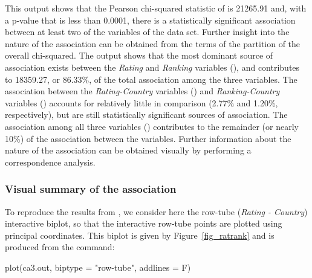 This output shows that the Pearson chi-squared statistic of  is 21265.91 and, with a p-value that is less than 0.0001,  there is a statistically significant association between at least two of the variables of the data set. Further insight into the nature of the association can be obtained from the terms of the partition of the overall chi-squared. The output shows that the most dominant source of association exists between the {\it Rating} and {\it Ranking} variables (), and contributes to 18359.27, or 86.33\%, of the total association among the three variables. The association between the {\it Rating-Country} variables () and {\it Ranking-Country} variables () accounts for relatively little in comparison (2.77\% and 1.20\%, respectively),  but are still statistically significant sources of association. The association among all three variables () contributes to the remainder (or nearly 10\%) of the association between the variables. Further information about the nature of the association can be obtained visually by performing a correspondence analysis. 

\subsubsection{Visual summary of the association}

To reproduce the results from \cite{vel07}, we consider here the row-tube ({\it Rating - Country}) interactive biplot, so that the interactive row-tube points are plotted using principal coordinates. This biplot is given by Figure~\ref{fig_ratrank} and is produced from the command:

\begin{example}
 plot(ca3.out, biptype = "row-tube", addlines = F)
\end{example}



